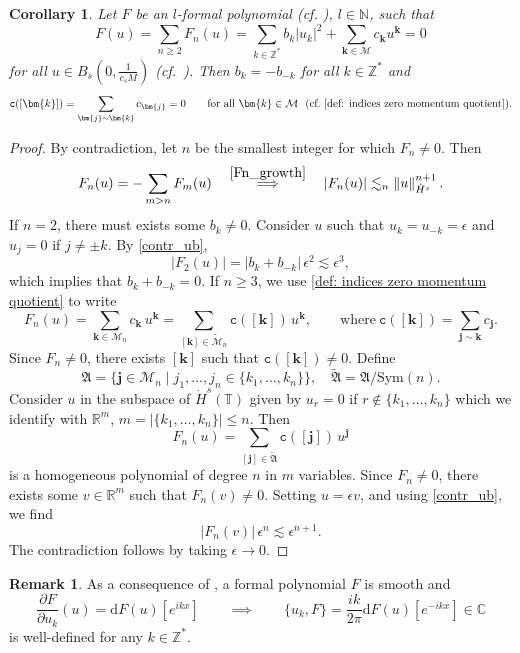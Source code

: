 \documentclass[a4paper,10pt,reqno]{article}
\theoremstyle{definition}
\theoremstyle{plain}
\theoremstyle{plain}
\theoremstyle{definition}
\theoremstyle{plain}
\newtheorem{cor}[definition]{Corollary}
\theoremstyle{plain}
\theoremstyle{plain}
\theoremstyle{definition}
\newtheorem{rem}[definition]{Remark}
\theoremstyle{definition}
\newcommand{\norm}[1]{\left\lVert #1 \right\rVert}
\def \N{\mathbb N}
\def \Z{\mathbb Z}
\def \R{\mathbb R}
\def \C{\mathbb C}
\def \pa{{\partial}}
\def \T{\mathbb{T}}
\def \M{\mathcal{M}}
\def \k{\bm{k}}
\def \j{\bm{j}}
\def \tc{\mathtt{c}}
\begin{document}
\begin{cor} \label{rmk: homogeneity argument}
Let $F$ be an $l$-formal polynomial (cf. ), $l\in\N$, such that 
\begin{equation}
F(u)= \sum_{n\geq 2} F_n(u) =\sum_{k \in \Z^*} b_k |u_k|^2 + \sum_{\k \in \M} c_{\k} u^{\k} = 0 
\end{equation}
for all $u\in B_s (0,\frac{1}{c_s M})$ (cf.~). Then $b_k=-b_{-k}$ for all $k\in\Z^*$ and 
\begin{equation}
    \tc ( [\k] )= \sum_{\j\sim\k} c_{\j}=0 \qquad \mbox{for all}\ \k\in\M \ \ \mbox{(cf.~\eqref{def: indices zero momentum quotient})}.
\end{equation}
\end{cor}
\begin{proof}
By contradiction, let $n$ be the smallest integer for which $F_n \neq 0$.
Then 
\begin{equation}\label{contr_ub}
F_n(u) = - \sum_{m > n} F_m(u) \quad \stackrel{\eqref{Fn_growth}}{\implies} \quad |F_n(u)| \lesssim_n \norm{u}_{\dot{H}^s}^{n+1}.
\end{equation}
If $n=2$, there must exists some $b_k \neq 0$. Consider $u$ such that $u_k=u_{-k}=\epsilon$ and $u_j = 0$ if $j \neq {\pm k}$. By \eqref{contr_ub},
\[
|F_2 (u)|= |b_k+b_{-k}|\,\epsilon^2 \lesssim \epsilon^3,
\]
which implies that $b_k+b_{-k}=0$. If $n \ge 3$, we use \eqref{def: indices zero momentum quotient} to write
\[
F_n (u)= \sum_{\k \in \M_n} c_{\k}\, u^{\k} = \sum_{[\k] \in \widetilde{\M}_n} \tc ([\k])\, u^{\k}, \qquad \mbox{where}\  \tc ([\k])= \sum_{\j\sim\k} c_{\j}.
\]
Since $F_n \neq 0$, there exists $[\k]$ such that $\tc([\k]) \neq 0$. Define 
\[
\mathfrak{A} = \{ \j\in  \M_n\mid j_1,\ldots,j_n\in \{ k_1,\ldots,k_n\}\}, \quad \widetilde{\mathfrak{A}} = \mathfrak{A}/\mbox{Sym}(n).
\]
Consider $u$ in the subspace of $\dot{H}^s(\T)$ given by $u_r= 0$ if $r\notin \{ k_1,\ldots,k_n\}$ which we identify with $\R^m$, $m=|\{ k_1,\ldots,k_n\}|\leq n$. Then
\[
F_n (u) = \sum_{[\j] \in \widetilde{\mathfrak{A}}} \tc ([\j])\, u^{\j}
\]
is a homogeneous polynomial of degree $n$ in $m$ variables. 
Since $F_n\neq 0$, there exists some $v \in \R^m$ such that $F_n (v)\neq 0$. Setting $u=\epsilon v$, and using \eqref{contr_ub}, we find
\[
|F_n (v)|\, \epsilon^{n} \lesssim \epsilon^{n+1}.
\]
The contradiction follows by taking $\epsilon\rightarrow 0$.
\end{proof}

\begin{rem}\label{diffuk_Frechet}
As a consequence of , a formal polynomial $F$ is smooth and 
\[
\frac{\pa F}{\pa u_k}(u) = \mathrm{d}F(u)[e^{ikx}] \qquad\implies \qquad
\{ u_k , F \} = \frac{ik}{2\pi} \mathrm{d}F(u)[e^{-ikx}] \in \C
\]
is well-defined for any $k \in \Z^*$.
\end{rem}
\end{document}
